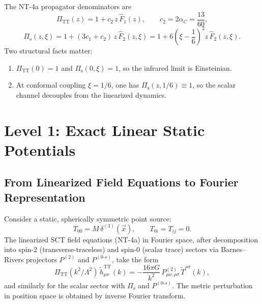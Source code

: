 \documentclass[11pt,a4paper]{article}
\newcommand{\PiTT}{\Pi_{\mathrm{TT}}}
\newcommand{\Pis}{\Pi_{\mathrm{s}}}
\newcommand{\Fhat}{\hat{F}}
\begin{document}
The NT-4a propagator denominators are
\begin{equation}\label{eq:PiTT}
  \PiTT(z) = 1 + c_2\, z\, \Fhat_1(z),
  \qquad
  c_2 = 2\alpha_C = \frac{13}{60},
\end{equation}
\begin{equation}\label{eq:Pis}
  \Pis(z,\xi)
  = 1 + (3c_1+c_2)\, z\, \Fhat_2(z,\xi)
  = 1 + 6\!\left(\xi-\frac{1}{6}\right)^{\!2} z\, \Fhat_2(z,\xi).
\end{equation}
Two structural facts matter:
\begin{enumerate}[nosep]
  \item $\PiTT(0)=1$ and $\Pis(0,\xi)=1$, so the infrared limit is
    Einsteinian.
  \item At conformal coupling $\xi = 1/6$, one has
    $\Pis(z,1/6) \equiv 1$, so the scalar channel decouples from the
    linearized dynamics.
\end{enumerate}


\section{Level 1: Exact Linear Static Potentials}
\label{sec:level1}

\subsection{From Linearized Field Equations to Fourier Representation}
\label{sec:fourier-derivation}

Consider a static, spherically symmetric point source:
\begin{equation}\label{eq:source}
  T_{00} = M\,\delta^{(3)}(\vec{x}),
  \qquad
  T_{0i} = T_{ij} = 0.
\end{equation}
The linearized SCT field equations (NT-4a) in Fourier space, after
decomposition into spin-2 (transverse-traceless) and spin-0 (scalar trace)
sectors via Barnes--Rivers projectors $P^{(2)}$ and $P^{(0\text{-}s)}$,
take the form
\begin{equation}\label{eq:lin-fourier}
  \PiTT(k^2/\Lambda^2)\,\tilde{h}^{\mathrm{TT}}_{\mu\nu}(k)
  = -\frac{16\pi G}{k^2}\,P^{(2)}_{\mu\nu,\rho\sigma}\,\tilde{T}^{\rho\sigma}(k),
\end{equation}
and similarly for the scalar sector with $\Pis$ and $P^{(0\text{-}s)}$.
The metric perturbation in position space is obtained by inverse Fourier
transform.
\end{document}
